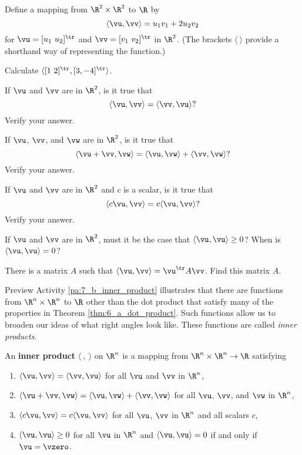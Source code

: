 \begin{pa} \label{pa:7_b_inner_product} Define a  mapping from $\R^2 \times \R^2$ to $\R$ by
\[\langle \vu, \vv \rangle = u_1v_1 + 2u_2v_2\]
for $\vu = [u_1 \ u_2]^{\tr}$ and $\vv = [v_1 \ v_2]^{\tr}$ in $\R^2$. (The brackets $\langle \ \rangle$ provide a shorthand way of representing the function.) 
\be
\item Calculate $\langle [1 \ 2]^{\tr}, [3,-4]^{\tr} \rangle$. 
	
\item If $\vu$ and $\vv$ are in $\R^2$, is it true that 
	\[ \langle \vu , \vv \rangle = \langle \vv , \vu \rangle?\]
	Verify your answer.
	
\item If $\vu$, $\vv$, and $\vw$ are in $\R^2$, is it true that 
	\[\langle \vu + \vv , \vw \rangle = \langle \vu , \vw \rangle + \langle \vv , \vw \rangle?\]
	Verify your answer.
	
\item If $\vu$ and $\vv$ are in $\R^2$ and $c$ is a scalar, is it true that 
\[\langle c\vu , \vv \rangle = c\langle \vu , \vv \rangle?\]
Verify your answer. 

\item If $\vu$ and $\vv$ are in $\R^2$, must it be the case that $\langle \vu , \vu \rangle \geq 0$? When is $\langle \vu , \vu \rangle = 0$?

\item There is a matrix $A$ such that $\langle \vu, \vv \rangle = \vu^{\tr} A \vv$. Find this matrix $A$.
 
\ee

\end{pa}

Preview Activity \ref{pa:7_b_inner_product} illustrates that there are functions from $\R^n \times \R^n$ to $\R$ other than the dot product that satisfy many of the properties in Theorem \ref{thm:6_a_dot_product}. Such functions allow us to broaden our ideas of what right angles look like. These functions are called \emph{inner products}. 

\begin{definition} \label{def:7_b_inner_product}  An \textbf{inner product} $\langle \ , \ \rangle$ on $\R^n$ is a mapping from $\R^n \times \R^n \to \R$ satisfying
\begin{enumerate}
\item $\langle \vu , \vv \rangle = \langle \vv , \vu \rangle$ for all $\vu$ and $\vv$ in $\R^n$,
\item $\langle \vu + \vv , \vw \rangle = \langle \vu , \vw \rangle + \langle \vv , \vw \rangle$ for all $\vu$, $\vv$, and $\vw$ in $\R^n$,
\item $\langle c\vu , \vv \rangle = c\langle \vu , \vv \rangle$ for all $\vu$, $\vv$ in $\R^n$ and all scalars $c$,
\item $\langle \vu , \vu \rangle \geq 0$ for all $\vu$ in $\R^n$ and $\langle \vu , \vu \rangle = 0$ if and only if $\vu = \vzero$.
\end{enumerate}
\end{definition}   

